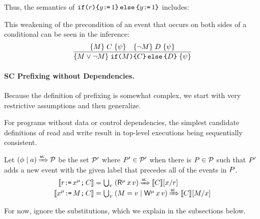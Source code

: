 Thus, the semantics of
 $\texttt{if}\allowbreak\texttt{(}r\texttt{)}\allowbreak\texttt{\{} y\texttt{:}\mkern-1mu\texttt{=}\,1 \texttt{\}}\,\allowbreak\texttt{else}\allowbreak\,\texttt{\{} y\texttt{:}\mkern-1mu\texttt{=}\,1\texttt{\}}$ 
includes:
\begin{tikzdisplay}[node distance=1em]
\end{tikzdisplay}
This weakening of the precondition of an event that occurs on both sides of a
conditional can be seen in the inference:
\begin{displaymath}
  \frac{
    \{M\}\allowbreak\;C\;\allowbreak\{\psi\}
    \quad
    \{\lnot M\}\allowbreak\;D\;\allowbreak\{\psi\}
  }{
    \{M\lor \lnot M\}\allowbreak\;\texttt{if}\allowbreak\texttt{(}M\texttt{)}\allowbreak\texttt{\{} C \texttt{\}}\,\allowbreak\texttt{else}\allowbreak\,\texttt{\{} D\texttt{\}}\;\allowbreak\{\psi\}
  }
\end{displaymath}


\paragraph{SC Prefixing without Dependencies.}
Because the definition of prefixing is somewhat complex, we start with very
restrictive assumptions and then generalize.

For programs without data or control dependencies, the
simplest candidate definitions of read and write
result in top-level executions being sequentially consistent.
\begin{candidate}
  \label{def:rw:sc1}
  Let $(\phi \mid a) \mathbin{\smash{\xRightarrow{\mathsf{sc}}}} \mathcal{P}$ be the set $\mathcal{P}'$ where
  $P'\in\mathcal{P}'$ when there is $P\in\mathcal{P}$ such that $P'$ adds a
  new event with the given label that precedes all of the events in $P$.
  \begin{align*}
    \sem{\aReg\GETS\aLoc^\amode\SEMI \aCmd} & =
    \textstyle\bigcup_\aVal\; (\DRmode\aLoc\aVal) \prefixsc \sem{\aCmd}[\aLoc/\aReg] 
    \\
    \sem{\aLoc^\amode\GETS\aExp\SEMI \aCmd} & =
    \textstyle\bigcup_\aVal\; (\aExp=\aVal \mid \DWmode\aLoc\aVal) \prefixsc \sem{\aCmd}[\aExp/\aLoc]
  \end{align*}
\end{candidate}
For now, ignore the substitutions, which we explain in the subsections below.

